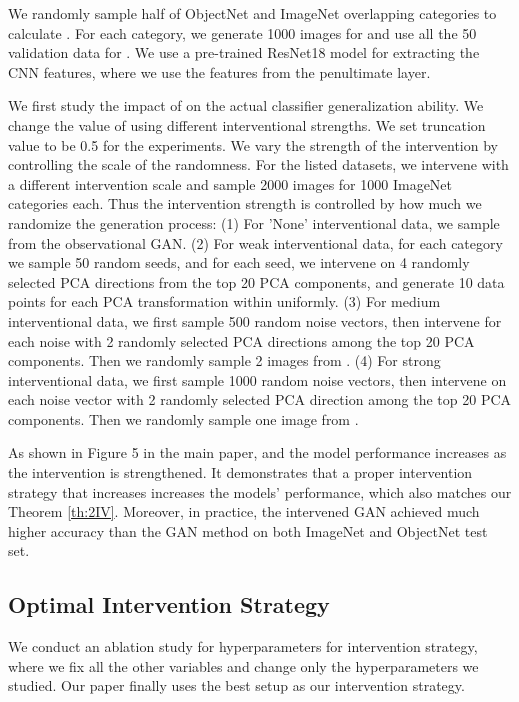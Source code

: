 \documentclass[final]{cvpr}
\begin{document}
\begin{subappendices}
We randomly sample half of ObjectNet and ImageNet overlapping categories to calculate . For each category, we generate 1000 images for   and use all the 50 validation data for . We use a pre-trained ResNet18 model for extracting the CNN features, where we use the features from the penultimate layer. 


We first study the impact of  on the actual classifier generalization ability. We change the value of  using different interventional strengths. We set truncation value to be 0.5 for the experiments. 
We vary the strength of the intervention by controlling the scale of the randomness. 
For the listed datasets, we intervene with a different intervention scale and sample 2000 images for 1000 ImageNet categories each. Thus the intervention strength is controlled by how much we randomize the generation process: (1) For 'None' interventional data, we sample from the observational GAN. (2) For weak interventional data, for each category we sample 50 random seeds, and for each seed, we intervene on 4 randomly selected PCA directions from the top 20 PCA components, and generate 10 data points for each PCA transformation within  uniformly. (3) For medium interventional data, we first sample 500 random noise vectors, then intervene for each noise with 2 randomly selected PCA directions among the top 20 PCA components. Then we randomly sample 2 images from . (4)  For strong interventional data, we first sample 1000 random noise vectors, then intervene on each noise vector with 2 randomly selected PCA direction among the top 20 PCA components. Then we randomly sample one image from .


As shown in Figure 5 in the main paper,  and the model performance increases as the intervention is strengthened.  It demonstrates that a proper intervention strategy that increases   increases the models' performance, which also matches our Theorem \ref{th:2IV}. Moreover, in practice, the intervened GAN achieved much higher accuracy than the GAN method on both ImageNet and ObjectNet test set. 

\subsection{Optimal Intervention Strategy}
We conduct an ablation study for hyperparameters for intervention strategy, where we fix all the other variables and change only the hyperparameters we studied. Our paper finally uses the best setup as our intervention strategy.


\end{subappendices}
\end{document}
